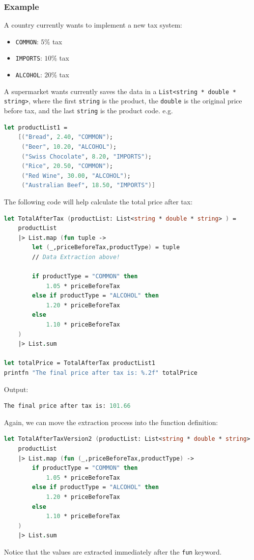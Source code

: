 \documentclass[12pt]{article}
\begin{document}
\subsubsection*{Example}
A country currently wants to implement a new tax system: 
\begin{itemize}
\item \texttt{COMMON}: $5\%$ tax
\item \texttt{IMPORTS}: $10\%$ tax
\item \texttt{ALCOHOL}: $20\%$ tax
\end{itemize}
A supermarket wants currently saves the data in a \texttt{List<string * double * string>}, where the first \texttt{string} is the product, the \texttt{double} is the original price before tax, and the last \texttt{string} is the product code. e.g.
\begin{lstlisting}[language=FSharp]
let productList1 =
    [("Bread", 2.40, "COMMON");
     ("Beer", 10.20, "ALCOHOL");
     ("Swiss Chocolate", 8.20, "IMPORTS");
     ("Rice", 20.50, "COMMON");
     ("Red Wine", 30.00, "ALCOHOL");
     ("Australian Beef", 18.50, "IMPORTS")]
\end{lstlisting}
\pagebreak
The following code will help calculate the total price after tax:
\begin{lstlisting}[language=FSharp]
let TotalAfterTax (productList: List<string * double * string> ) =
    productList
    |> List.map (fun tuple ->
        let (_,priceBeforeTax,productType) = tuple
        // Data Extraction above!

        if productType = "COMMON" then
            1.05 * priceBeforeTax
        else if productType = "ALCOHOL" then
            1.20 * priceBeforeTax
        else 
            1.10 * priceBeforeTax
    )
    |> List.sum

let totalPrice = TotalAfterTax productList1
printfn "The final price after tax is: %.2f" totalPrice
\end{lstlisting}
Output:
\begin{lstlisting}[language=FSharp]
The final price after tax is: 101.66
\end{lstlisting}
Again, we can move the extraction process into the function definition:

\begin{lstlisting}[language=FSharp]
let TotalAfterTaxVersion2 (productList: List<string * double * string> ) =
    productList
    |> List.map (fun (_,priceBeforeTax,productType) ->
        if productType = "COMMON" then
            1.05 * priceBeforeTax
        else if productType = "ALCOHOL" then
            1.20 * priceBeforeTax
        else 
            1.10 * priceBeforeTax
    )
    |> List.sum
\end{lstlisting}
Notice that the values are extracted immediately after the \texttt{fun} keyword.
\pagebreak
\end{document}
